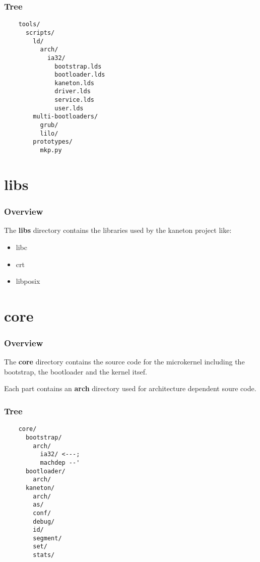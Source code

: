 \documentclass[8pt]{beamer}
\newcommand{\nl}[0]{\vspace{0.4cm}}
\begin{document}
\begin{frame}[containsverbatim]
  \frametitle{Tree}

  \begin{verbatim}
    tools/
      scripts/
        ld/
          arch/
            ia32/
              bootstrap.lds
              bootloader.lds
              kaneton.lds
              driver.lds
              service.lds
              user.lds
        multi-bootloaders/
          grub/
          lilo/
        prototypes/
          mkp.py
  \end{verbatim}
\end{frame}

%
%

\section{libs}


\begin{frame}
  \frametitle{Overview}

  The \textbf{libs} directory contains the libraries used by the kaneton
  project like:

  \begin{itemize}
    \item
      libc
    \item
      crt
    \item
      libposix
  \end{itemize}
\end{frame}

%
%

\section{core}


\begin{frame}
  \frametitle{Overview}

  The \textbf{core} directory contains the source code for the microkernel
  including the bootstrap, the bootloader and the kernel itsef.

  \nl

  Each part contains an \textbf{arch} directory used for architecture
  dependent soure code.
\end{frame}


\begin{frame}[containsverbatim]
  \frametitle{Tree}

  \begin{verbatim}
    core/
      bootstrap/
        arch/
          ia32/ <---;
          machdep --'
      bootloader/
        arch/
      kaneton/
        arch/
        as/
        conf/
        debug/
        id/
        segment/
        set/
        stats/
  \end{verbatim}
\end{frame}
\end{document}
